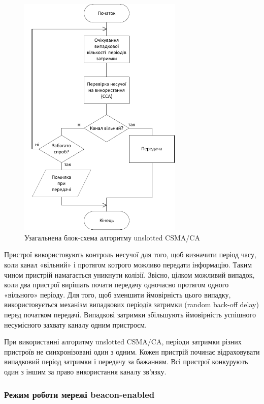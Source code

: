 \documentclass[a4paper,ukrainian,utf8,nocolumnsxix,floatsection,equationsection]{eskdtext}
\renewcommand\paragraph{\subsubsection}
\newcommand{\csma}[0]{CSMA/CA\xspace}
\newcommand{\ucsma}[0]{unslotted \csma\xspace}
\newcommand{\bem}[0]{beacon-enabled\xspace}
\begin{document}
\begin{figure}[htbp]
	\centering
	\includegraphics[width=0.7\textwidth]{img/csma-ca.pdf}
	\caption{\label{fig:csma-ca}Узагальнена блок-схема алгоритму \ucsma}
\end{figure}


Пристрої використовують контроль несучої для того, щоб визначити період часу, коли канал «вільний» і протягом котрого можливо передати інформацію. Таким чином пристрій намагається уникнути колізії. Звісно, цілком можливий випадок, коли два пристрої вирішать почати передачу  одночасно протягом одного  «вільного» періоду. Для того, щоб зменшити ймовірність цього випадку, використовується механізм випадкових періодів затримки (random back-off delay) перед початком передачі. Випадкові затримки збільшують ймовірність успішного несумісного захвату каналу одним пристроєм.

При використанні алгоритму \ucsma, періоди затримки різних пристроїв не синхронізовані один з одним. Кожен пристрій починає відраховувати випадковий період затримки і передачу за бажанням. Всі пристрої конкурують один з іншим за право використання каналу зв’язку. 


\paragraph{Режим роботи мережі \bem}
\label{par:beacon:enabled:mode}
\end{document}
